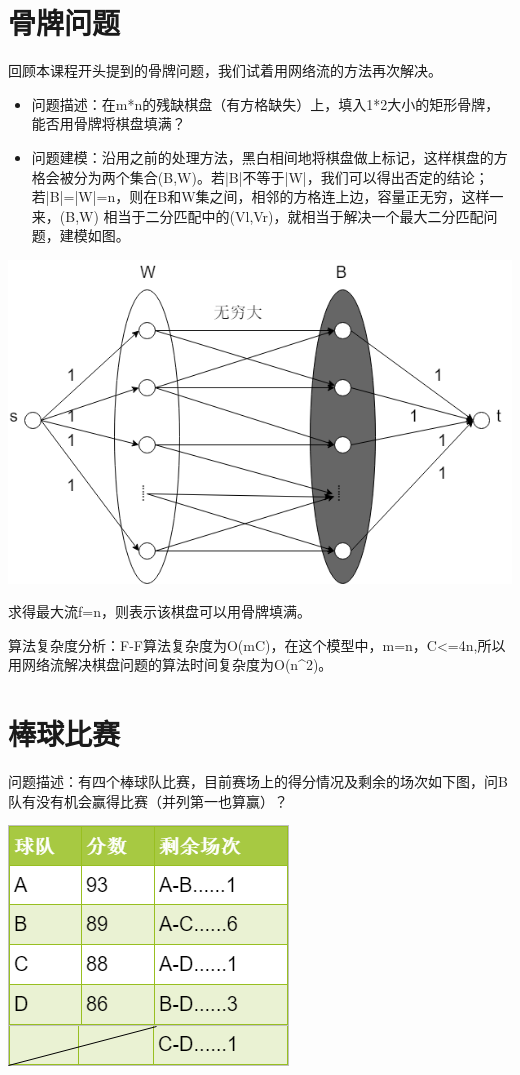 \section{骨牌问题}
回顾本课程开头提到的骨牌问题，我们试着用网络流的方法再次解决。

\begin{itemize}
  \item 问题描述：在m*n的残缺棋盘（有方格缺失）上，填入1*2大小的矩形骨牌，能否用骨牌将棋盘填满？

  \item 问题建模：沿用之前的处理方法，黑白相间地将棋盘做上标记，这样棋盘的方格会被分为两个集合(B,W)。若|B|不等于|W|，我们可以得出否定的结论；若|B|=|W|=n，则在B和W集之间，相邻的方格连上边，容量正无穷，这样一来，(B,W) 相当于二分匹配中的(Vl,Vr)，就相当于解决一个最大二分匹配问题，建模如图。

\end{itemize}
\centerline{\includegraphics[scale=0.6]{Ln11.image/networkflow4.png}}

求得最大流f=n，则表示该棋盘可以用骨牌填满。

算法复杂度分析：F-F算法复杂度为O(mC)，在这个模型中，m=n，C<=4n,所以用网络流解决棋盘问题的算法时间复杂度为O(n^2)。

\section{棒球比赛}
问题描述：有四个棒球队比赛，目前赛场上的得分情况及剩余的场次如下图，问B队有没有机会赢得比赛（并列第一也算赢）？

\centerline{\includegraphics[scale=0.6]{Ln11.image/networkflow5.png}}

